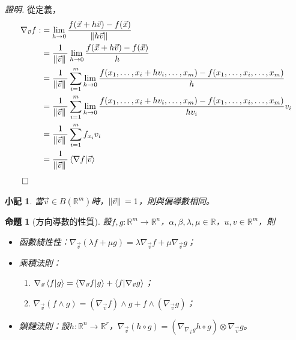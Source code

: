 \documentclass[12pt]{article}
\newtheorem*{proposition}{命題}
\newtheorem*{remark}{小記}
\renewenvironment*{proof}{\textit{證明.}}{\hfill$\qed$}
\begin{document}
    \begin{proof}
        從定義，\begin{align*}
            \nabla_{\vec{v}}f:&=\lim_{h\to 0}\frac{f(\vec{x}+h\vec{v})-f(\vec{x})}{\norm*{h\vec{v}}}\\
            &=\frac{1}{\norm*{\vec{v}}}\lim_{h\to 0}\frac{f(\vec{x}+h\vec{v})-f(\vec{x})}{h}\\
            &=\frac{1}{\norm*{\vec{v}}}\sum_{i=1}^{m}\lim_{h\to 0}\frac{f(x_1,\dots,x_i+hv_i,\dots,x_m)-f(x_1,\dots,x_i,\dots,x_m)}{h}\\
            &=\frac{1}{\norm*{\vec{v}}}\sum_{i=1}^{m}\lim_{h\to 0}\frac{f(x_1,\dots,x_i+hv_i,\dots,x_m)-f(x_1,\dots,x_i,\dots,x_m)}{hv_i}v_i\\
            &=\frac{1}{\norm*{\vec{v}}}\sum_{i=1}^{m}f_{x_i}v_i\\
            &=\frac{1}{\norm*{\vec{v}}}\innerproduct{\nabla f}{\vec{v}}\\
        \end{align*}
    \end{proof}

    \begin{remark}
        當$\vec{v}\in B(\mathbb{R}^m)$時，$\norm*{\vec{v}}=1$，則與偏導數相同。
    \end{remark}

    \begin{proposition}[方向導數的性質]
        設$f,g:\mathbb{R}^m\to\mathbb{R}^n$，$\alpha,\beta,\lambda,\mu\in\mathbb{R}$，$u,v\in\mathbb{R}^m$，則\begin{itemize}
            \item 函數綫性性：$\nabla_{\vec{v}}(\lambda f+\mu g)=\lambda\nabla_{\vec{v}}f+\mu\nabla_{\vec{v}}g$；
            \item 乘積法則：\begin{enumerate}
                \item $\nabla_{\vec{v}}\innerproduct{f}{g}=\innerproduct{\nabla_{\vec{v}}f}{g} +\innerproduct{f}{\nabla_{\vec{v}}g}$；
                \item $\nabla_{\vec{v}}(f\wedge g)=(\nabla_{\vec{v}}f)\wedge g +f\wedge (\nabla_{\vec{v}}g)$；
            \end{enumerate}
            \item 鎖鏈法則：設$h:\mathbb{R}^n\to\mathbb{R}^r$，$\nabla_{\vec{v}}(h\circ g)=(\nabla_{\nabla_{\vec{v}}g}h\circ g)\otimes \nabla_{\vec{v}}g$。
        \end{itemize}
    \end{proposition}
\end{document}
